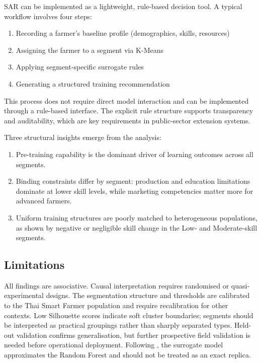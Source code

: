 \documentclass[3p,twocolumn,authoryear]{elsarticle}
\begin{document}
SAR can be implemented as a lightweight, rule-based decision tool. A typical
workflow involves four steps:
\begin{enumerate}
  \item Recording a farmer’s baseline profile (demographics, skills, resources)
  \item Assigning the farmer to a segment via K-Means
  \item Applying segment-specific surrogate rules
  \item Generating a structured training recommendation
\end{enumerate}

This process does not require direct model interaction and can be implemented
through a rule-based interface. The explicit rule structure supports
transparency and auditability, which are key requirements in public-sector
extension systems.

Three structural insights emerge from the analysis:
\begin{enumerate}
  \item Pre-training capability is the dominant driver of learning outcomes
  across all segments.
  \item Binding constraints differ by segment: production and education
  limitations dominate at lower skill levels, while marketing competencies matter
  more for advanced farmers.
  \item Uniform training structures are poorly matched to heterogeneous
  populations, as shown by negative or negligible skill change in the Low- and
  Moderate-skill segments.
\end{enumerate}

\subsection{Limitations}

All findings are associative. Causal interpretation requires randomised or
quasi-experimental designs. The segmentation structure and thresholds are
calibrated to the Thai Smart Farmer population and require recalibration for
other contexts. Low Silhouette scores indicate soft cluster boundaries; segments
should be interpreted as practical groupings rather than sharply separated
types. Held-out validation confirms generalisation, but further prospective
field validation is needed before operational deployment. Following
\citet{rudin2019}, the surrogate model approximates the Random Forest and should
not be treated as an exact replica.
\end{document}
